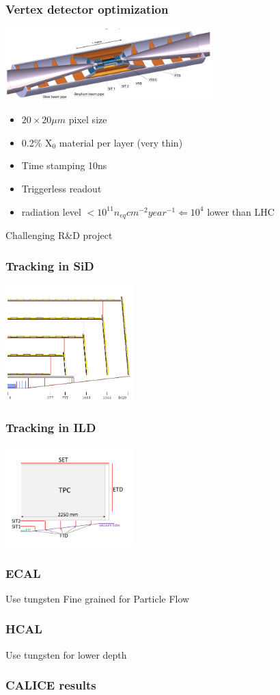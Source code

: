 \documentclass{beamer}
\begin{document}
\begin{frame}
\frametitle{Vertex detector optimization}
\includegraphics[width=8cm]{VertexDetector.png}
\begin{itemize}
  \item $20\times20\mu m$ pixel size
  \item 0.2\% X$_0$ material per layer (very thin)
  \item Time stamping 10ns
  \item Triggerless readout
  \item radiation level $<10^{11} n_{eq}cm^{-2}year^{-1}  \Leftarrow 10^4$ lower
  than LHC
\end{itemize}
\alert{Challenging R\&D project}
\end{frame}

\begin{frame}
\frametitle{Tracking in SiD}
\includegraphics[width=5cm]{sid_tracker_zx.pdf}
\end{frame}
\begin{frame}
\frametitle{Tracking in ILD}
\includegraphics[width=5cm]{CLIC_ILD_tracking_geom.pdf}
\end{frame}
\begin{frame}
\frametitle{ECAL}
Use tungsten Fine grained for Particle Flow
\end{frame}
\begin{frame}
\frametitle{HCAL}
Use tungsten for lower depth
\end{frame}
\begin{frame}
\frametitle{CALICE results}
\end{frame}
\end{document}
